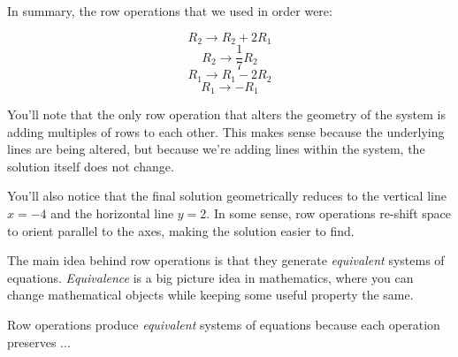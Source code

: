 \documentclass{ximera}
\begin{document}
        \begin{solution}
    
            In summary, the row operations that we used in  order were:
    
            $$R_2\rightarrow R_2+2R_1$$
            $$R_2\rightarrow \frac{1}{7}R_2$$
            $$R_1\rightarrow R_1-2R_2$$
            $$R_1\rightarrow -R_1$$

        You'll note that the only row operation that alters the geometry of the system is adding multiples of rows to each other. This makes sense because the underlying lines are being altered, but because we're adding lines within the system, the solution itself does not change.

        You'll also notice that the final solution geometrically reduces to the vertical line $x=-4$ and the horizontal line $y=2$. In some sense, row operations re-shift space to orient parallel to the axes, making the solution easier to find.
    
        \end{solution}

      
    
    The main idea behind row operations is that they generate \emph{equivalent} systems of equations. \emph{Equivalence} is a big picture idea in mathematics, where you can change mathematical objects while keeping some useful property the same.
    
    \begin{example}
    
        Row operations produce \emph{equivalent} systems of equations because each operation preserves $\ldots$
    
        \begin{multipleChoice}
        \end{multipleChoice}
    
    \end{example}
\end{document}
